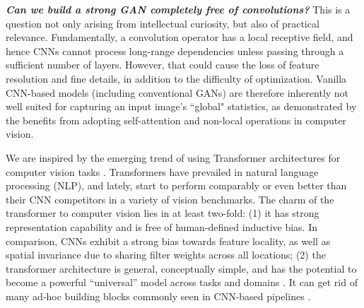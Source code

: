 \documentclass{article}
\begin{document}
\textit{\textbf{Can we build a strong GAN completely free of convolutions?}} This is a question not only arising from intellectual curiosity, but also of practical relevance.  Fundamentally, a convolution operator has a local receptive field, and hence CNNs cannot process long-range dependencies unless passing through a sufficient number of layers. However, that could cause the loss of feature resolution and fine details, in addition to the difficulty of optimization. Vanilla CNN-based models (including conventional GANs) are therefore inherently not well suited for capturing an input image's ``global" statistics, as demonstrated by the benefits from adopting self-attention \cite{zhang2019self} and non-local \cite{wang2018non} operations in computer vision.

We are inspired by the emerging trend of using Transformer architectures for computer vision tasks \cite{carion2020end,zeng2020learning,dosovitskiy2020image}. Transformers \cite{vaswani2017attention,devlin2018bert} have prevailed in natural language processing (NLP), and lately, start to perform comparably or even better than their CNN competitors in a variety of vision benchmarks. The charm of the transformer to computer vision lies in at least two-fold: (1) it has strong representation capability and is free of human-defined inductive bias.  In comparison, CNNs exhibit a strong bias towards feature locality, as well as spatial invariance due to sharing filter weights across all locations;  (2) the transformer architecture is general, conceptually simple, and has the potential to become a powerful “universal” model across tasks and domains \cite{dosovitskiy2020image}. It can get rid of many ad-hoc building blocks commonly seen in CNN-based pipelines \cite{carion2020end}.
\end{document}
